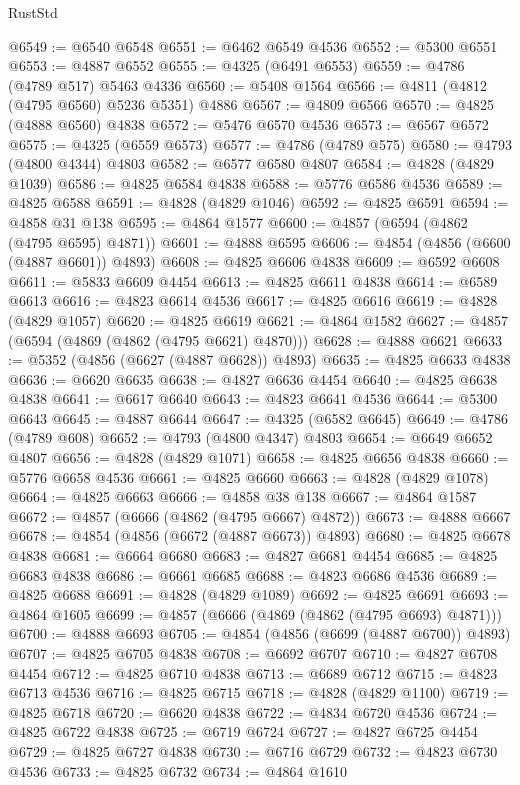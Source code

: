 \begin{lexlean}{RustStd}
\begin{coremodule}
{\begin{coremodule}
{{{{{{{{{{{{{{{{{{{{{{{{{{{{{{{{{{{{{{{{{{{{{{{{{{{{{{{{{{{{{{{{{{{{{{{{{{{{{{{{@6549 := @6540 @6548
@6551 := @6462 @6549 @4536
@6552 := @5300 @6551
@6553 := @4887 @6552
@6555 := @4325 (@6491 @6553)
@6559 := @4786 (@4789 @517) @5463 @4336
@6560 := @5408 @1564
@6566 := @4811 (@4812 (@4795 @6560) @5236 @5351) @4886
@6567 := @4809 @6566
@6570 := @4825 (@4888 @6560) @4838
@6572 := @5476 @6570 @4536
@6573 := @6567 @6572
@6575 := @4325 (@6559 @6573)
@6577 := @4786 (@4789 @575)
@6580 := @4793 (@4800 @4344) @4803
@6582 := @6577 @6580 @4807
@6584 := @4828 (@4829 @1039)
@6586 := @4825 @6584 @4838
@6588 := @5776 @6586 @4536
@6589 := @4825 @6588
@6591 := @4828 (@4829 @1046)
@6592 := @4825 @6591
@6594 := @4858 @31 @138
@6595 := @4864 @1577
@6600 := @4857 (@6594 (@4862 (@4795 @6595) @4871))
@6601 := @4888 @6595
@6606 := @4854 (@4856 (@6600 (@4887 @6601)) @4893)
@6608 := @4825 @6606 @4838
@6609 := @6592 @6608
@6611 := @5833 @6609 @4454
@6613 := @4825 @6611 @4838
@6614 := @6589 @6613
@6616 := @4823 @6614 @4536
@6617 := @4825 @6616
@6619 := @4828 (@4829 @1057)
@6620 := @4825 @6619
@6621 := @4864 @1582
@6627 := @4857 (@6594 (@4869 (@4862 (@4795 @6621) @4870)))
@6628 := @4888 @6621
@6633 := @5352 (@4856 (@6627 (@4887 @6628)) @4893)
@6635 := @4825 @6633 @4838
@6636 := @6620 @6635
@6638 := @4827 @6636 @4454
@6640 := @4825 @6638 @4838
@6641 := @6617 @6640
@6643 := @4823 @6641 @4536
@6644 := @5300 @6643
@6645 := @4887 @6644
@6647 := @4325 (@6582 @6645)
@6649 := @4786 (@4789 @608)
@6652 := @4793 (@4800 @4347) @4803
@6654 := @6649 @6652 @4807
@6656 := @4828 (@4829 @1071)
@6658 := @4825 @6656 @4838
@6660 := @5776 @6658 @4536
@6661 := @4825 @6660
@6663 := @4828 (@4829 @1078)
@6664 := @4825 @6663
@6666 := @4858 @38 @138
@6667 := @4864 @1587
@6672 := @4857 (@6666 (@4862 (@4795 @6667) @4872))
@6673 := @4888 @6667
@6678 := @4854 (@4856 (@6672 (@4887 @6673)) @4893)
@6680 := @4825 @6678 @4838
@6681 := @6664 @6680
@6683 := @4827 @6681 @4454
@6685 := @4825 @6683 @4838
@6686 := @6661 @6685
@6688 := @4823 @6686 @4536
@6689 := @4825 @6688
@6691 := @4828 (@4829 @1089)
@6692 := @4825 @6691
@6693 := @4864 @1605
@6699 := @4857 (@6666 (@4869 (@4862 (@4795 @6693) @4871)))
@6700 := @4888 @6693
@6705 := @4854 (@4856 (@6699 (@4887 @6700)) @4893)
@6707 := @4825 @6705 @4838
@6708 := @6692 @6707
@6710 := @4827 @6708 @4454
@6712 := @4825 @6710 @4838
@6713 := @6689 @6712
@6715 := @4823 @6713 @4536
@6716 := @4825 @6715
@6718 := @4828 (@4829 @1100)
@6719 := @4825 @6718
@6720 := @6620 @4838
@6722 := @4834 @6720 @4536
@6724 := @4825 @6722 @4838
@6725 := @6719 @6724
@6727 := @4827 @6725 @4454
@6729 := @4825 @6727 @4838
@6730 := @6716 @6729
@6732 := @4823 @6730 @4536
@6733 := @4825 @6732
@6734 := @4864 @1610
}}}}}}}}}}}}}}}}}}}}}}}}}}}}}}}}}}}}}}}}}}}}}}}}}}}}}}}}}}}}}}}}}}}}}}}}}}}}}}}}
\end{coremodule}}
\end{coremodule}
\end{lexlean}
